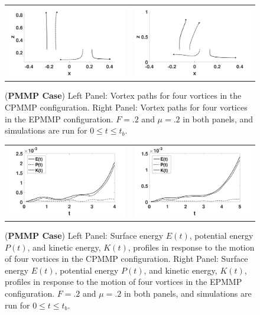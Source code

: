 \documentclass[a4paper,11pt]{article}
\begin{document}
%
\begin{figure}[!h]
\centering
\begin{tabular}{cc}
\includegraphics[width=.5\textwidth]{tracks_F_pt2_tf_4_pmmp} & 
\includegraphics[width=.5\textwidth]{tracks_F_pt2_tf_5_pmmp_sym}
\end{tabular}
\caption{\small ({\bf PMMP Case}) Left Panel: Vortex paths for four vortices in the CPMMP configuration.  Right Panel: Vortex paths for four vortices in the EPMMP configuration. $F=.2$ and $\mu=.2$ in both panels, and simulations are run for $0\leq t \leq t_{b}$.}
\label{fig:trackpmmp}
\end{figure}

\begin{figure}[!h]
\centering
\begin{tabular}{cc}
\includegraphics[width=.5\textwidth]{energy_profile_mu_pt2_F_pt2_pmmp} &
\includegraphics[width=.5\textwidth]{energy_profile_mu_pt2_F_pt2_pmmp_sym}
\end{tabular}
\caption{\small ({\bf PMMP Case}) Left Panel: Surface energy $E(t)$, potential energy $P(t)$, and kinetic energy, $K(t)$, profiles in response to the motion of four vortices in the CPMMP configuration.  Right Panel: Surface energy $E(t)$, potential energy $P(t)$, and kinetic energy, $K(t)$, profiles in response to the motion of four vortices in the EPMMP configuration.  $F=.2$ and $\mu=.2$ in both panels, and simulations are run for $0\leq t \leq t_{b}$.}
\label{fig:eprof_pmmp}
\end{figure}
\end{document}
